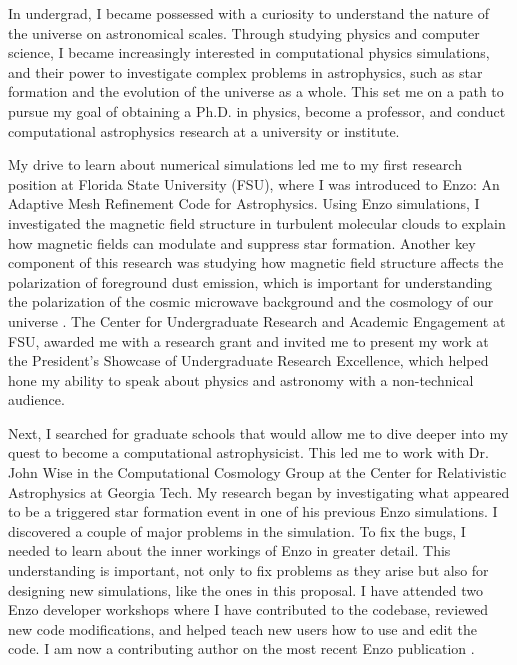 \documentclass[letterpaper, 12pt]{article}
\begin{document}

In undergrad, I became possessed with a curiosity to understand the nature of the universe on astronomical scales. Through studying physics and computer science, I became increasingly interested in computational physics simulations, and their power to investigate complex problems in astrophysics, such as star formation and the evolution of the universe as a whole. This set me on a path to pursue my goal of obtaining a Ph.D. in physics, become a professor, and conduct computational astrophysics research at a university or institute. 

My drive to learn about numerical simulations led me to my first research position at Florida State University (FSU), where I was introduced to Enzo: An Adaptive Mesh Refinement Code for Astrophysics. Using Enzo simulations, I investigated the magnetic field structure in turbulent molecular clouds to explain how magnetic fields can modulate and suppress star formation. Another key component of this research was studying how magnetic field structure affects the polarization of foreground dust emission, which is important for understanding the polarization of the cosmic microwave background and the cosmology of our universe \citep{Clark2015}. The Center for Undergraduate Research and Academic Engagement at FSU, awarded me with a research grant and invited me to present my work at the President’s Showcase of Undergraduate Research Excellence, which helped hone my ability to speak about physics and astronomy with a non-technical audience.

Next, I searched for graduate schools that would allow me to dive deeper into my quest to become a computational astrophysicist. This led me to work with Dr. John Wise in the Computational Cosmology Group at the Center for Relativistic Astrophysics at Georgia Tech. My research began by investigating what appeared to be a triggered star formation event in one of his previous Enzo simulations. I discovered a couple of major problems in the simulation. To fix the bugs, I needed to learn about the inner workings of Enzo in greater detail. This understanding is important, not only to fix problems as they arise but also for designing new simulations, like the ones in this proposal. I have attended two Enzo developer workshops where I have contributed to the codebase, reviewed new code modifications, and helped teach new users how to use and edit the code. I am now a contributing author on the most recent Enzo publication \citep{ENZO2019_JOSS}.
\end{document}
